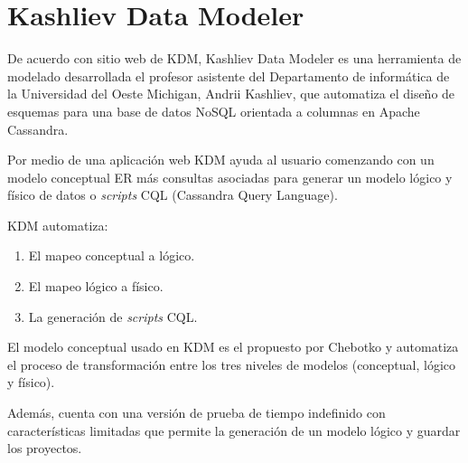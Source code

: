 \section{Kashliev Data Modeler}
De acuerdo con sitio web de KDM\cite{datafluent_kashliev_2020}, Kashliev Data Modeler es una herramienta de modelado desarrollada el profesor asistente del Departamento de informática de la Universidad del Oeste Michigan, Andrii Kashliev, que automatiza el diseño de esquemas para una base de datos NoSQL orientada a columnas en Apache Cassandra. 


Por medio de una aplicación web KDM ayuda al usuario comenzando con un modelo conceptual ER más consultas asociadas para generar un modelo lógico y físico de datos o \textit{scripts} CQL (Cassandra Query Language). 


KDM automatiza: 

\begin{enumerate}
    \item El mapeo conceptual a lógico.
    \item El mapeo lógico a físico.
    \item La generación de \textit{scripts} CQL.
\end{enumerate}

El modelo conceptual usado en KDM es el propuesto por Chebotko\cite{chebotko_big_2015} y automatiza el proceso de transformación entre los tres niveles de modelos (conceptual, lógico y físico).


Además, cuenta con una versión de prueba de tiempo indefinido con características limitadas que permite la generación de un modelo lógico y guardar los proyectos.
